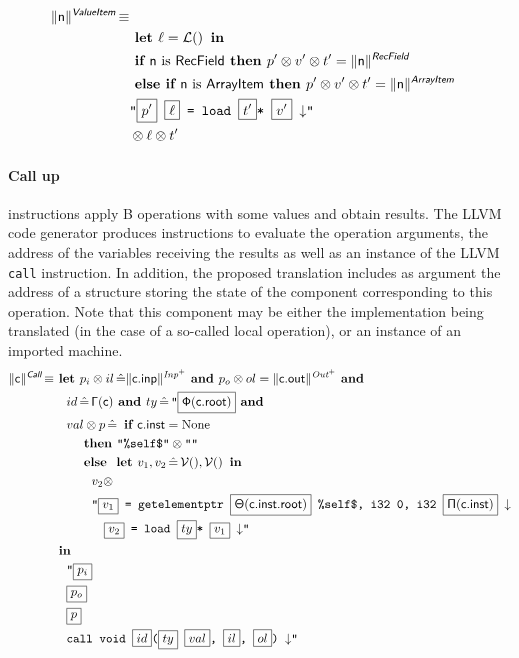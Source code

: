 \documentclass{llncs}
\newcommand{\trad}[2]{\ensuremath{\lVert \textsf{#1} \rVert^{\textit{#2}}}}
\newcommand{\nl}[0]{\ensuremath{\downarrow}}
\DeclareMathOperator{\isdef}{\equiv}
\DeclareMathOperator{\lbl}{\mathcal{L}()}
\DeclareMathOperator{\variable}{\mathcal{V}()}
\newcommand{\llvm}[1]{\texttt{#1}}
\newcommand{\B}[1]{\textsf{#1}}
\newcommand{\ListOf}[1]{$\mbox{#1}^+$}
\newcommand{\IF}[0]{\textbf{ if }}
\newcommand{\ELSIF}[0]{\textbf{ else if }}
\newcommand{\ELSE}[0]{\textbf{ else }}
\newcommand{\THEN}[0]{\textbf{ then }}
\newcommand{\LET}[0]{\textbf{ let }}
\DeclareMathOperator{\BE}{\hat{=}}
\newcommand{\IN}[0]{\textbf{ in }}
\newcommand{\AND}[0]{\textbf{ and }}
\newcommand{\PH}[1]{\framebox{$#1$}}
\newcommand{\sep}[0]{\otimes}
\newcommand{\Global}[0]{\ensuremath{\sf\Gamma}}
\newcommand{\idx}[0]{\ensuremath{\sf\Pi}}
\newcommand{\state}[0]{\ensuremath{\sf\Theta}}
\newcommand{\stateref}[0]{\ensuremath{\sf\Phi}}
\newcommand{\self}[0]{\llvm{\%self\$}}
\begin{document}
\begin{align*}
\begin{split}
  \trad{n}{\B{ValueItem}} \isdef \\
   & \LET \ell = \lbl  \IN\\
   & \IF \B{n} \mbox{ is \B{RecField}} \THEN p' \sep v' \sep t' = \trad{\B{n}}{\B{RecField}} \\
   & \ELSIF \B{n} \mbox{ is \B{ArrayItem}} \THEN p' \sep v' \sep t' = \trad{\B{n}}{\B{ArrayItem}} \\
   & \llvm{"\PH{p'} \PH{\ell}  = load  \PH{t'}* \PH{v'} \nl"} \\
   & \sep  \ell  \sep t'\\
\end{split}
\end{align*}


\paragraph{Call up} instructions apply B operations with some values and obtain
results. The LLVM code generator produces instructions to evaluate the operation
arguments, the address of the variables receiving the results as well as an
instance of the LLVM \llvm{call} instruction. In addition, the proposed
translation includes as argument the address of a structure storing the state of
the component corresponding to this operation. Note that this component may be
either the implementation being translated (in the case of a so-called local
operation), or an instance of an imported machine.
\begin{align*}
  \trad{c}{\B{Call}} \isdef
  & \LET p_i \sep il \BE \trad{c.inp}{\ListOf{Inp}} \AND p_o \sep ol =
  \trad{c.out}{\ListOf{Out}} \AND \\
  & \quad id \BE {\Global(\B{c})} \AND ty \BE \llvm{"\PH{\stateref(\B{c.root})}} \AND \\
  & \quad val \sep p \BE \IF \B{c.inst} = \text{None} \\
  & \quad \quad \THEN \llvm{"\self"} \sep \llvm{""} \\
  & \quad \quad \ELSE \LET v_1, v_2 \BE \variable, \variable \IN \\
  & \quad \quad \quad v_2 \sep \\
  & \quad \quad \quad \llvm{"\PH{v_1} = getelementptr \PH{ \state({\B{c.inst.root}})} \self, i32 0, i32 \PH{\idx(\B{c.inst})} \nl} \\
  & \quad \quad \quad \quad \llvm{\PH{v_2} = load \PH{ty}* \PH{v_1} \nl"} \\
  & \IN \\
  & \quad \llvm{"\PH{p_i}} \\
  & \quad \llvm{\PH{p_o}} \\
  & \quad \llvm{\PH{p}} \\
  & \quad \llvm{call void \PH{id}(\PH{ty} \PH{val}, \PH{il}, \PH{ol}) \nl"}
\end{align*}
\end{document}

